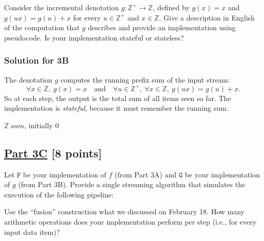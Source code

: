 \documentclass[11pt]{article}
\newcommand{\Z}{\mathbb{Z}}
\newcommand{\kplus}{^+}
\newcommand{\F}{\texttt{F}}
\newcommand{\G}{\texttt{G}}
\begin{document}
Consider the incremental denotation $g: \Z\kplus \to \Z$, defined by $g(x) = x$ and $g(u x) = g(u) + x$ for every $u \in \Z\kplus$ and $x \in \Z$. Give a description in English of the computation that $g$ describes and provide an implementation using pseudocode. Is your implementation stateful or stateless?

\subsubsection*{Solution for 3B}

The denotation $g$ computes the running prefix sum of the input stream:
\[
\forall x \in \Z,\ g(x)=x
\quad\text{and}\quad
\forall u \in \Z\kplus,\ \forall x \in \Z,\ g(u x)=g(u)+x.
\]
So at each step, the output is the total sum of all items seen so far. The implementation is \emph{stateful}, because it must remember the running sum.
\begin{center}
\begin{minipage}{0.3\textwidth}
\SetAlgoLined
\setcounter{AlgoLine}{0}



$\Z\ \textit{sum}$, initially $0$

\Fn{\Update{$\Z\ y$}}{
	$\textit{sum} \leftarrow \textit{sum} + y$

	\Return $\textit{sum}$
}
\end{minipage}
\end{center}

\subsection*{\underline{Part 3C} [8 points]}

Let $\F$ be your implementation of $f$ (from Part 3A) and $\G$ be your implementation of $g$ (from Part 3B). Provide a single streaming algorithm that simulates the execution of the following pipeline:
\begin{center}
\end{center}
Use the ``fusion'' construction what we discussed on February 18. How many arithmetic operations does your implementation perform per step (i.e., for every input data item)?
\end{document}
